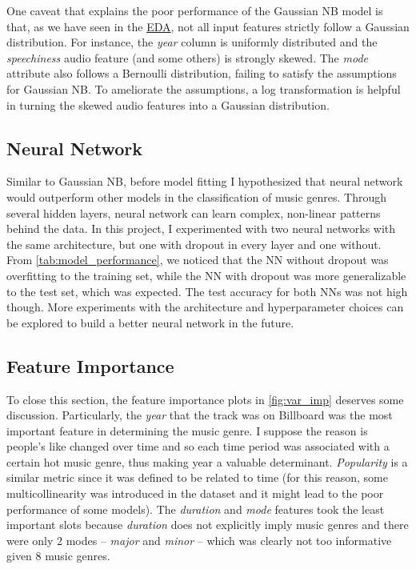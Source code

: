 \documentclass{article}
\begin{document}
One caveat that explains the poor performance of the Gaussian NB model is that, as we have seen in the \href{https://bulldf.github.io/billboard-songs-analysis-with-spotify/EDA.html}{EDA}, not all input features strictly follow a Gaussian distribution. For instance, the \textit{year} column is uniformly distributed and the \textit{speechiness} audio feature (and some others) is strongly skewed. The \textit{mode} attribute also follows a Bernoulli distribution, failing to satisfy the assumptions for Gaussian NB. To ameliorate the assumptions, a log transformation is helpful in turning the skewed audio features into a Gaussian distribution.

\subsection{Neural Network}

Similar to Gaussian NB, before model fitting I hypothesized that neural network would outperform other models in the classification of music genres. Through several hidden layers, neural network can learn complex, non-linear patterns behind the data. In this project, I experimented with two neural networks with the same architecture, but one with dropout in every layer and one without. From \autoref{tab:model_performance}, we noticed that the NN without dropout was overfitting to the training set, while the NN with dropout was more generalizable to the test set, which was expected. The test accuracy for both NNs was not high though. More experiments with the architecture and hyperparameter choices can be explored to build a better neural network in the future.

\subsection{Feature Importance}

To close this section, the feature importance plots in \autoref{fig:var_imp} deserves some discussion. Particularly, the \textit{year} that the track was on Billboard was the most important feature in determining the music genre. I suppose the reason is people's like changed over time and so each time period was associated with a certain hot music genre, thus making year a valuable determinant. \textit{Popularity} is a similar metric since it was defined to be related to time (for this reason, some multicollinearity was introduced in the dataset and it might lead to the poor performance of some models). The \textit{duration} and \textit{mode} features took the least important slots because \textit{duration} does not explicitly imply music genres and there were only 2 modes -- \textit{major} and \textit{minor} -- which was clearly not too informative given 8 music genres.
\end{document}
